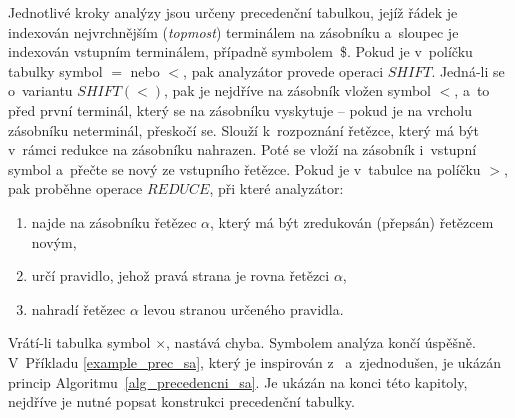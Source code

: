 Jednotlivé kroky analýzy jsou určeny precedenční tabulkou, jejíž řádek je indexován nejvrchnějším (\emph{topmost}) terminálem na zásobníku a~sloupec je indexován vstupním terminálem, případně symbolem~\$.
Pokud je v~políčku tabulky symbol $=$ nebo $<$, pak analyzátor provede operaci $SHIFT$.
Jedná-li se o~variantu $SHIFT(<)$, pak je nejdříve na zásobník vložen symbol $<$, a~to před první terminál, který se na zásobníku vyskytuje -- pokud je na vrcholu zásobníku neterminál, přeskočí se.
Slouží k~rozpoznání řetězce, který má být v~rámci redukce na zásobníku nahrazen.
Poté se vloží na zásobník i~vstupní symbol a~přečte se nový ze vstupního řetězce.
Pokud je v~tabulce na políčku $>$, pak proběhne operace $REDUCE$, při které analyzátor:
\begin{enumerate}
    \item najde na zásobníku řetězec $\alpha$, který má být zredukován (přepsán) řetězcem novým,
    \item určí pravidlo, jehož pravá strana je rovna řetězci $\alpha$,
    \item nahradí řetězec $\alpha$ levou stranou určeného pravidla.
\end{enumerate}
Vrátí-li tabulka symbol $\times$, nastává chyba. 
Symbolem \checkmark analýza končí úspěšně.
V~Příkladu \ref{example_prec_sa}, který je inspirován z~\cite{medunaElementsOfCompDesign} a~zjednodušen, je ukázán princip Algoritmu~\ref{alg_precedencni_sa}.
Je ukázán na konci této kapitoly, nejdříve je nutné popsat konstrukci precedenční tabulky.

